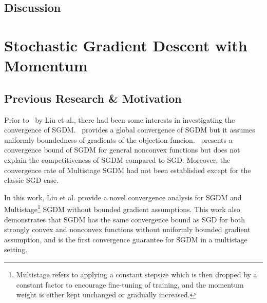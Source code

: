 \documentclass{article}
\begin{document}
\subsection{Discussion}
\section{Stochastic Gradient Descent with Momentum}
\label{section4}
\subsection{Previous Research \& Motivation}
\setcounter{equation}{0}
Prior to~\cite{NEURIPS2020_d3f5d4de} by Liu et al., there had been some interests in investigating the convergence of SGDM.~\cite{https://doi.org/10.48550/arxiv.1905.03817} provides a global convergence of SGDM but it assumes uniformly boundedness of gradients of the objection funcion.~\cite{https://doi.org/10.48550/arxiv.1808.10396} presents a convergence bound of SGDM for general nonconvex functions but does not explain the competitiveness of SGDM compared to SGD.
Moreover, the convergence rate of Multistage SGDM had not been established except for the classic SGD case.

In this work, Liu et al. provide a novel convergence analysis for SGDM and
Multistage\footnote{Multistage refers to applying a constant stepsize which is then dropped by a constant factor to encourage fine-tuning of training, and the momentum weight is either kept unchanged or gradually increased.}
SGDM without bounded gradient assumptions. This work also demonstrates that SGDM has the same convergence bound as SGD for both strongly convex and nonconvex functions without uniformly bounded gradient assumption,
and is the first convergence guarantee for SGDM in a multistage setting.
\end{document}
